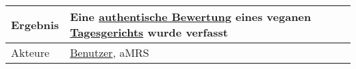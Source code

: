 \begin{table}[H]
\begin{tabularx}{\textwidth}{| l | X |}
        \hline
        Ergebnis           & Eine \hyperref[gls:authentischeBewertung]{authentische Bewertung} eines veganen \hyperref[gls:tagesgericht]{Tagesgerichts} wurde verfasst                                                                                                                                                                                                                                                                                                                                                                                                                                                                                                                                                                                         \\
        \hline
        Akteure            & \hyperref[gls:nutzer]{Benutzer}, \ac{aMRS}                                                                                                                                                                                                                                                                                                                                                                                                                                                                                                                                                                                                                                                                                        \\
        \hline
    \end{tabularx}
\end{table}



